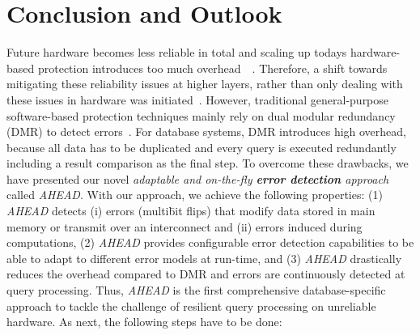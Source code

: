 \section{Conclusion and Outlook}
\label{sec:Conclusion}

Future hardware becomes less reliable in total and scaling up todays hardware-based protection introduces too much overhead~~\cite{DBLP:journals/micro/Borkar05,DBLP:conf/dac/HenkelBDGNSTW13,DBLP:books/daglib/0037372,DBLP:journals/it/ShafiqueABCCDEH15}. Therefore, a shift towards mitigating these reliability issues at higher layers, rather than only dealing with these issues in hardware was initiated~\cite{DBLP:conf/dac/HenkelBDGNSTW13,DBLP:books/daglib/0037372,DBLP:journals/it/ShafiqueABCCDEH15}. However, traditional general-purpose software-based protection techniques mainly rely on dual modular redundancy (DMR) to detect errors~\cite{goloubeva2006software,oh2002error,DBLP:conf/cgo/ReisCVRA05,DBLP:books/daglib/0037372}. For database systems, DMR introduces high overhead, because all data has to be duplicated and every query is executed redundantly including a result comparison as the final step. To overcome these drawbacks, we have presented our novel \emph{adaptable and on-the-fly \textbf{error detection} approach} called \emph{AHEAD}. With our approach, we achieve the following properties: (1) \emph{AHEAD} detects (i) errors (multi\=bit flips) that modify data stored in main memory or transmit over an interconnect and (ii) errors induced during computations, (2) \emph{AHEAD} provides configurable error detection capabilities to be able to adapt to different error models at run-time, and (3) \emph{AHEAD} drastically reduces the overhead compared to DMR and errors are continuously detected at query processing. Thus, \emph{AHEAD} is the first comprehensive database-specific approach to tackle the challenge of resilient query processing on unreliable hardware. As next, the following steps have to be done: 

